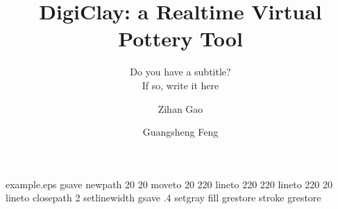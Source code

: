 %
%
%
%
%
\begin{filecontents*}{example.eps}
gsave
newpath
  20 20 moveto
  20 220 lineto
  220 220 lineto
  220 20 lineto
closepath
2 setlinewidth
gsave
  .4 setgray fill
grestore
stroke
grestore
\end{filecontents*}
%
\RequirePackage{fix-cm}
%
\documentclass[smallextended]{svjour3}       %
%
\smartqed  %
%
\usepackage{graphicx}
%
%
%
%
%


\title{DigiClay: a Realtime Virtual Pottery Tool%
}
\subtitle{Do you have a subtitle?\cite{Jacob2008Reality}  \\ If so, write it here \cite{website:unity3d}}


\author{Zihan Gao         \and
        Guangsheng Feng %
}


